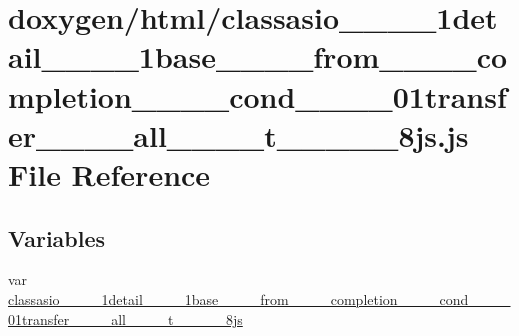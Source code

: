 \hypertarget{classasio____1____1detail____1____1base________from________completion________cond____3____01tran425db4c17182d7ad0a8fb795dc081056}{}\section{doxygen/html/classasio\+\_\+\+\_\+\_\+\+\_\+1detail\+\_\+\+\_\+\_\+\+\_\+1base\+\_\+\+\_\+\+\_\+\+\_\+from\+\_\+\+\_\+\+\_\+\+\_\+completion\+\_\+\+\_\+\+\_\+\+\_\+cond\+\_\+\+\_\+\_\+\+\_\+01transfer\+\_\+\+\_\+\+\_\+\+\_\+all\+\_\+\+\_\+\+\_\+\+\_\+t\+\_\+\+\_\+\_\+\+\_\+\_\+8js.js File Reference}
\label{classasio____1____1detail____1____1base________from________completion________cond____3____01tran425db4c17182d7ad0a8fb795dc081056}
\subsection*{Variables}
\begin{DoxyCompactItemize}
\item 
var \hyperlink{classasio____1____1detail____1____1base________from________completion________cond____3____01tran425db4c17182d7ad0a8fb795dc081056_afd4e9fdf9a540d6f0d87c5386226c87e}{classasio\+\_\+\+\_\+\_\+\+\_\+1detail\+\_\+\+\_\+\_\+\+\_\+1base\+\_\+\+\_\+\+\_\+\+\_\+from\+\_\+\+\_\+\+\_\+\+\_\+completion\+\_\+\+\_\+\+\_\+\+\_\+cond\+\_\+\+\_\+\_\+\+\_\+01transfer\+\_\+\+\_\+\+\_\+\+\_\+all\+\_\+\+\_\+\+\_\+\+\_\+t\+\_\+\+\_\+\_\+\+\_\+\_\+8js}
\end{DoxyCompactItemize}


